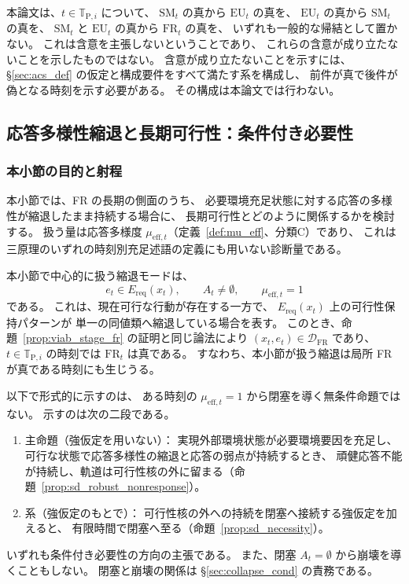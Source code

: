 \begin{remark}[含意関係の限定]
\label{rem:principle_implication_scope}
本論文は、$t\in\mathbb{T}_{\mathrm{P},i}$ について、
$\mathrm{SM}_t$ の真から $\mathrm{EU}_t$ の真を、
$\mathrm{EU}_t$ の真から $\mathrm{SM}_t$ の真を、
$\mathrm{SM}_t$ と $\mathrm{EU}_t$ の真から $\mathrm{FR}_t$ の真を、
いずれも一般的な帰結として置かない。
これは含意を主張しないということであり、
これらの含意が成り立たないことを示したものではない。
含意が成り立たないことを示すには、
\S\ref{sec:acs_def} の仮定と構成要件をすべて満たす系を構成し、
前件が真で後件が偽となる時刻を示す必要がある。
その構成は本論文では行わない。
\end{remark}

\subsection{応答多様性縮退と長期可行性：条件付き必要性}
\label{subsec:sd_necessity}

\subsubsection{本小節の目的と射程}

本小節では、FR の長期の側面のうち、
必要環境充足状態に対する応答の多様性が縮退したまま持続する場合に、
長期可行性とどのように関係するかを検討する。
扱う量は応答多様度 $\mu_{\mathrm{eff},t}$（定義~\ref{def:mu_eff}、分類C）であり、
これは三原理のいずれの時刻別充足述語の定義にも用いない診断量である。

本小節で中心的に扱う縮退モードは、
\[
  e_t\in E_{\mathrm{req}}(x_t),
  \qquad
  A_t\neq\emptyset,
  \qquad
  \mu_{\mathrm{eff},t}=1
\]
である。
これは、現在可行な行動が存在する一方で、
$E_{\mathrm{req}}(x_t)$ 上の可行性保持パターンが
単一の同値類へ縮退している場合を表す。
このとき、命題~\ref{prop:viab_stage_fr} の証明と同じ論法により
$(x_t,e_t)\in\mathcal{D}_{\mathrm{FR}}$ であり、
$t\in\mathbb{T}_{\mathrm{P},i}$ の時刻では $\mathrm{FR}_t$ は真である。
すなわち、本小節が扱う縮退は局所 FR が真である時刻にも生じうる。

以下で形式的に示すのは、
ある時刻の $\mu_{\mathrm{eff},t}=1$ から閉塞を導く無条件命題ではない。
示すのは次の二段である。
\begin{enumerate}
  \item 主命題（強仮定を用いない）：
  実現外部環境状態が必要環境要因を充足し、可行な状態で応答多様性の縮退と応答の弱点が持続するとき、
  頑健応答不能が持続し、軌道は可行性核の外に留まる（命題~\ref{prop:sd_robust_nonresponse}）。
  \item 系（強仮定のもとで）：
  可行性核の外への持続を閉塞へ接続する強仮定を加えると、
  有限時間で閉塞へ至る（命題~\ref{prop:sd_necessity}）。
\end{enumerate}
いずれも条件付き必要性の方向の主張である。
また、閉塞 $A_t=\emptyset$ から崩壊を導くこともしない。
閉塞と崩壊の関係は \S\ref{sec:collapse_cond} の責務である。

